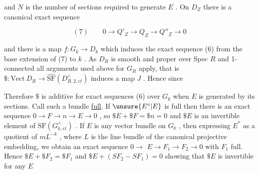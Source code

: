 
and $N$ is the number of sections required to generate $E$ . On
$D_Z$ there is a canonical exact sequence

\[ (7) \qquad 0 \to Q'_Z \to Q_Z \to Q''_{\underline Z} \to 0 \]

and there is a map $f:G_k \to D_k$ which induces the exact sequence
(6) from the base extension of (7) to $k$ . As $D_R$ is smooth and
proper over Spec $R$ and 1-connected all arguments used above for
$G_R$ apply, that is $\$:\mathrm{Vect}\ D_R \to \hat{\mathrm{SF}}(D^{\wedge}_{R,2,et})$ induces a map $J$ .
Hence since


Therefore $\$$ is additive for exact sequences (6) over $G_k$
when $E$ is generated by its sections. Call such a bundle \uline{full}.
If $\unsure{E^\circ|E}$ is full then $\overline{\text{there}}$ is an exact sequence $0 \to F \to n \to E \to 0$ ,
so $\$E + \$F = \$n = 0$ and $\$E$ is an invertible element of
$\mathrm{SF}(G^{\wedge}_{k,et})$ . If $E$ is any vector bundle on $G_k$ , then expressing
$E^*$ as a quotient of $mL^{-k}$ , where $L$ is the line bundle of the
canonical projective embedding, we obtain an exact sequence $0 \to$
$E \to F_1 \to F_2 \to 0$ with $F_1$ full. Hence $\$E + \$F_2 = \$F_1$ and
$\$E + (SF_2 - SF_1) = 0$ showing that $\$E$ is invertible for any $E$

